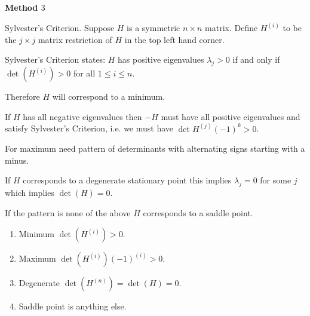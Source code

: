 \documentclass[10pt, a4paper]{article}
\begin{document}
\textbf{Method $3$}

Sylvester's Criterion.
Suppose $H$ is a symmetric $n \times n$ matrix.
Define $H ^ {(i)}$ to be the $j \times j$ matrix restriction of $H$ in the top left hand corner.

Sylvester's Criterion states:
$H$ has positive eigenvalues $\lambda_j > 0$ if and only if $\det(H ^ {(i)}) > 0$ for all $1 \leq i \leq n$.

Therefore $H$ will correspond to a minimum.

If $H$ has all negative eigenvalues then $-H$ must have all positive eigenvalues and satisfy Sylvester's Criterion,
i.e. we must have $\det{H ^ {(j)}}(-1) ^ k > 0$.

For maximum need pattern of determinants with alternating signs starting with a minus.

If $H$ corresponds to a degenerate stationary point this implies $\lambda_j = 0$ for some $j$ which implies $\det(H) = 0$.

If the pattern is none of the above $H$ corresponds to a saddle point.

\begin{enumerate}[label = (\roman*)]
    \item Minimum $\det(H ^ {(i)}) > 0$.
    
    \item Maximum $\det(H ^ {(i)})(-1) ^ {(i)} > 0$.

    \item Degenerate $\det(H ^ {(n)}) = \det(H) = 0$.

    \item Saddle point is anything else.
\end{enumerate}
\end{document}
